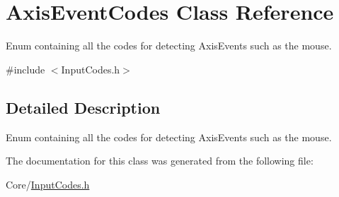 \hypertarget{class_axis_event_codes}{}\section{Axis\+Event\+Codes Class Reference}
\label{class_axis_event_codes}


Enum containing all the codes for detecting Axis\+Events such as the mouse.  




{\ttfamily \#include $<$Input\+Codes.\+h$>$}



\subsection{Detailed Description}
Enum containing all the codes for detecting Axis\+Events such as the mouse. 

The documentation for this class was generated from the following file\+:\begin{DoxyCompactItemize}
\item 
Core/\hyperlink{_input_codes_8h}{Input\+Codes.\+h}\end{DoxyCompactItemize}
